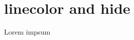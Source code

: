 \documentclass{article}
\begin{document}
\TestTitleDesc{}
{}

\section{linecolor and hide}

Lorem
impsum
\end{document}
